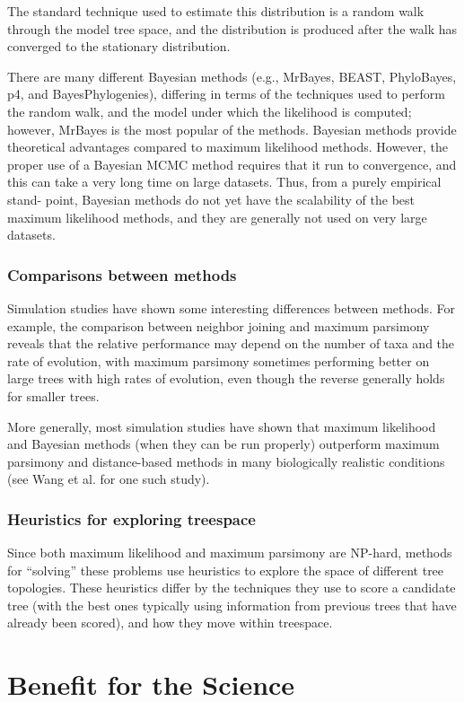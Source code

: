 The standard technique used to estimate this distribution 
is a random walk through the model tree space, and the 
distribution is produced after the walk has converged to 
the stationary distribution.

There are many different Bayesian methods (e.g., MrBayes, BEAST, 
PhyloBayes, p4, and BayesPhylogenies), differing in terms 
of the techniques used to perform the random walk, and 
the model under which the likelihood is computed; however, 
MrBayes is the most popular of the methods. Bayesian 
methods provide theoretical advantages compared to 
maximum likelihood methods. However, the proper use of a 
Bayesian MCMC method requires that it run to convergence, 
and this can take a very long time on large datasets. 
Thus, from a purely empirical stand- point, Bayesian 
methods do not yet have the scalability of the best 
maximum likelihood methods, and they are generally 
not used on very large datasets.

\subsubsection{Comparisons between methods}
Simulation studies have shown some interesting 
differences between methods. For example, the 
comparison between neighbor joining and maximum 
parsimony reveals that the relative performance may 
depend on the number of taxa and the rate of evolution, 
with maximum parsimony sometimes performing better 
on large trees with high rates of evolution, even 
though the reverse generally holds for smaller trees.  

More generally, most simulation studies have shown 
that maximum likelihood and Bayesian methods 
(when they can be run properly) outperform maximum 
parsimony and distance-based methods in many 
biologically realistic conditions 
(see Wang et al. for one such study).

\subsubsection{Heuristics for exploring treespace}
Since both maximum likelihood and maximum parsimony 
are NP-hard, methods for ``solving'' these problems 
use heuristics to explore the space of different tree 
topologies. These heuristics differ by the techniques 
they use to score a candidate tree (with the best 
ones typically using information from previous 
trees that have already been scored), and how 
they move within treespace. 
 
\section{Benefit for the Science}
\newpage